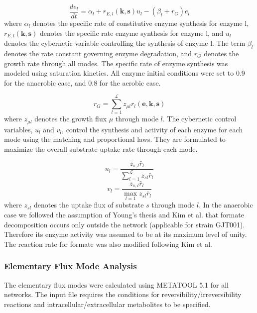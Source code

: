 \documentclass[10pt,twocolumn,twoside,final]{IEEEtran}
\begin{document}
\begin{equation}
	\frac{de_{l}}{dt}  = \alpha_{l} + r_{E,l}\left(\mathbf{k},\mathbf{s}\right)u_{l} - \left(\beta_{l}+r_{G}\right)e_{l}
\end{equation}
where $\alpha_{l}$ denotes the specific rate of constitutive enzyme synthesis for enzyme l, $r_{E,l}\left(\mathbf{k},\mathbf{s}\right)$ denotes the specific rate enzyme synthesis for enzyme l, and $u_{l}$ denotes the cybernetic variable controlling the synthesis of enzyme l.
The term $\beta_{l}$ denotes the rate constant governing enzyme degradation, and $r_{G}$ denotes the growth rate through all modes.
The specific rate of enzyme synthesis was modeled using saturation kinetics.
All enzyme initial conditions were set to 0.9 for the anaerobic case, and 0.8 for the aerobic case.

\begin{equation}
	r_{G}  = \sum_{l = 1}^{\mathcal{L}}z_{\mu l}r_{l}\left(\mathbf{e},\mathbf{k},\mathbf{s}\right)
\end{equation}
where $z_{\mu l}$ denotes the growth flux $\mu$ through mode $l$.
The cybernetic control variables, $u_{l}$ and $v_{l}$, control the synthesis and activity of each enzyme for each mode using the matching and proportional laws\cite{2007_young_ramkrishna_BiotechProg}.
They are formulated to maximize the overall substrate uptake rate through each mode.

\begin{equation}
	u_{l}  = \frac{z_{s,l}\bar{r}_{l}}{\sum_{l = 1}^{\mathcal{L}}z_{sl}\bar{r}_{l}}
\end{equation}
\begin{equation}
	v_{l} = \frac{z_{s,l}\bar{r}_{l}}{\max_{l=1} z_{sl}\bar{r}_{l}}
\end{equation}
where $z_{sl}$ denotes the uptake flux of substrate $s$ through mode $l$.
In the anaerobic case we followed the assumption of Young's thesis\cite{2005_Young} and Kim et al.\cite{2008_kim_varner_ramkrishna_BiotechProg} that formate decomposition occurs only outside the network (applicable for strain GJT001).
Therefore its enzyme activity was assumed to be at its maximum level of unity.
The reaction rate for formate was also modified following Kim et al.\cite{2008_kim_varner_ramkrishna_BiotechProg}

\subsubsection*{Elementary Flux Mode Analysis}
The elementary flux modes were calculated using METATOOL 5.1\cite{2006_vonKamp_Metatool} for all networks.
The input file requires the conditions for reversibility/irreversibility reactions and intracellular/extracellular metabolites to be specified.
\end{document}

